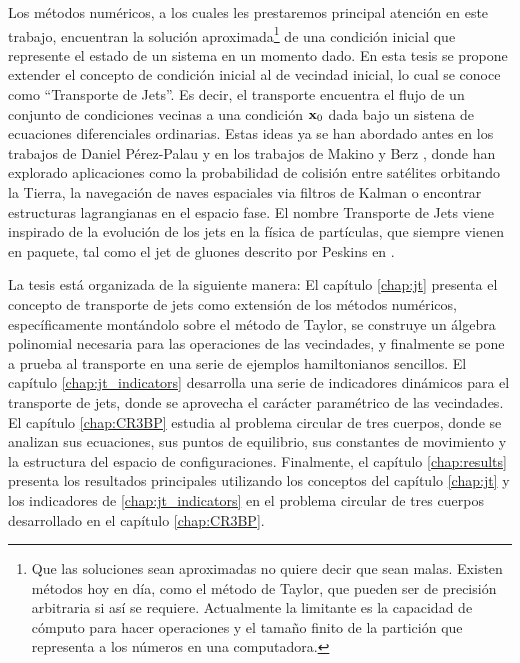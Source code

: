 Los métodos numéricos, a los cuales les prestaremos principal atención en este trabajo, encuentran la solución aproximada\footnote{Que las soluciones sean aproximadas no quiere decir que sean malas. Existen métodos hoy en día, como el método de Taylor, que pueden ser de precisión arbitraria si así se requiere. Actualmente la limitante es la capacidad de cómputo para hacer operaciones y el tamaño finito de la partición que representa a los números en una computadora.} de una condición inicial que represente el estado de un sistema en un momento dado. En esta tesis se propone extender el concepto de condición inicial al de vecindad inicial, lo cual se conoce como ``Transporte de Jets''. Es decir, el transporte encuentra el flujo de un conjunto de condiciones vecinas a una condición $\mathbf{x}_0$ dada bajo un sistena de ecuaciones diferenciales ordinarias. Estas ideas ya se han abordado antes en los trabajos de Daniel Pérez-Palau \cite{Daniel2015, Perez2013, Perez2015} y en los trabajos de Makino y Berz \cite{Berz1991,Berz1998}, donde han explorado aplicaciones como la probabilidad de colisión entre satélites orbitando la Tierra, la navegación de naves espaciales via filtros de Kalman o  encontrar estructuras lagrangianas en el espacio fase. El nombre Transporte de Jets viene inspirado de la evolución de los jets en la física de partículas, que siempre vienen en paquete, tal como el jet de gluones descrito por Peskins en \cite{Peskin1996}.

La tesis está organizada de la siguiente manera: El capítulo \ref{chap:jt} presenta el concepto de transporte de jets como extensión de los métodos numéricos, específicamente montándolo sobre el método de Taylor, se construye un álgebra polinomial necesaria para las operaciones de las vecindades, y finalmente se pone a prueba al transporte en una serie de ejemplos hamiltonianos sencillos. El capítulo \ref{chap:jt_indicators} desarrolla una serie de indicadores dinámicos para el transporte de jets, donde se aprovecha el carácter paramétrico de las vecindades. El capítulo \ref{chap:CR3BP} estudia al problema circular de tres cuerpos, donde se analizan sus ecuaciones, sus puntos de equilibrio, sus constantes de movimiento y la estructura del espacio de configuraciones. Finalmente, el capítulo \ref{chap:results} presenta los resultados principales utilizando los conceptos del capítulo \ref{chap:jt} y los indicadores de \ref{chap:jt_indicators} en el problema circular de tres cuerpos desarrollado en el capítulo \ref{chap:CR3BP}. 


